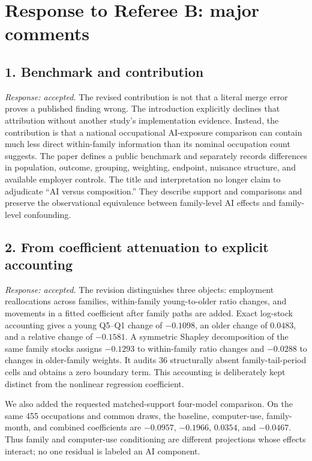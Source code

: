 \documentclass[11pt,letterpaper]{article}
\begin{document}
\section*{Response to Referee B: major comments}

\subsection*{1. Benchmark and contribution}

\emph{Response: accepted.}  The revised contribution is not that a literal merge error proves a published finding wrong.  The introduction explicitly declines that attribution without another study's implementation evidence.  Instead, the contribution is that a national occupational AI-exposure comparison can contain much less direct within-family information than its nominal occupation count suggests.  The paper defines a public benchmark and separately records differences in population, outcome, grouping, weighting, endpoint, nuisance structure, and available employer controls.  The title and interpretation no longer claim to adjudicate ``AI versus composition.''  They describe support and comparisons and preserve the observational equivalence between family-level AI effects and family-level confounding.

\subsection*{2. From coefficient attenuation to explicit accounting}

\emph{Response: accepted.}  The revision distinguishes three objects: employment reallocations across families, within-family young-to-older ratio changes, and movements in a fitted coefficient after family paths are added.  Exact log-stock accounting gives a young Q5--Q1 change of $-0.1098$, an older change of $0.0483$, and a relative change of $-0.1581$.  A symmetric Shapley decomposition of the same family stocks assigns $-0.1293$ to within-family ratio changes and $-0.0288$ to changes in older-family weights.  It audits 36 structurally absent family-tail-period cells and obtains a zero boundary term.  This accounting is deliberately kept distinct from the nonlinear regression coefficient.

We also added the requested matched-support four-model comparison.  On the same 455 occupations and common draws, the baseline, computer-use, family-month, and combined coefficients are $-0.0957$, $-0.1966$, $0.0354$, and $-0.0467$.  Thus family and computer-use conditioning are different projections whose effects interact; no one residual is labeled an AI component.
\end{document}
